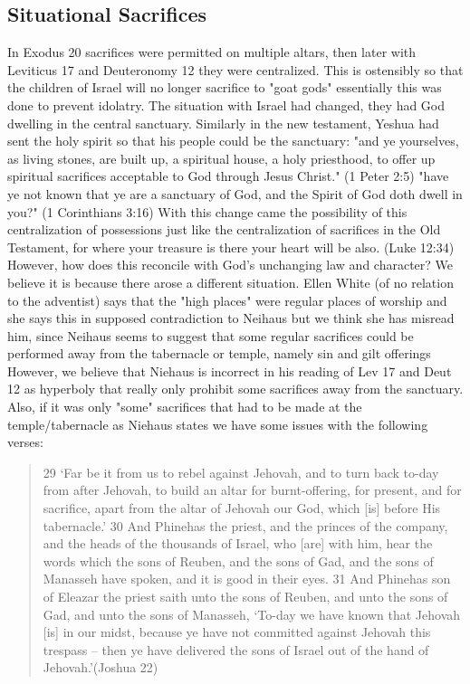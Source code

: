 \documentclass[11pt]{article}
\begin{document}
\subsection{Situational Sacrifices} \label{situational sacrifices}
In Exodus 20 sacrifices were permitted on multiple altars, then later with Leviticus 17 and Deuteronomy 12 they were centralized. This is ostensibly so that the children of Israel will no longer sacrifice to "goat gods" essentially this was done to prevent idolatry. The situation with Israel had changed, they had God dwelling in the central sanctuary. Similarly in the new testament, Yeshua had sent the holy spirit so that his people could be the sanctuary: 
"and ye yourselves, as living stones, are built up, a spiritual house, a holy priesthood, to offer up spiritual sacrifices acceptable to God through Jesus Christ." (1 Peter 2:5)
"have ye not known that ye are a sanctuary of God, and the Spirit of God doth dwell in you?" (1 Corinthians 3:16) With this change came the possibility of this centralization of possessions just like the centralization of sacrifices in the Old Testament, for where your treasure is there your heart will be also. (Luke 12:34) However, how does this reconcile with God's unchanging law and character? We believe it is because there arose a different situation. 
Ellen White (of no relation to the adventist) says that the "high places" were regular places of worship\cite{ellen white} and she says this in supposed contradiction to Neihaus but we think she has misread him, since Neihaus seems to suggest that some regular sacrifices could be performed away from the tabernacle or temple, namely sin and gilt offerings \cite{niehaus} However, we believe that Niehaus is incorrect in his reading of Lev 17 and Deut 12 as hyperboly that really only prohibit some sacrifices away from the sanctuary. Also, if it was only "some" sacrifices that had to be made at the temple/tabernacle as Niehaus states we have some issues with the following verses:
\begin{quote}
29 `Far be it from us to rebel against Jehovah, and to turn back to-day from after Jehovah, to build an altar for burnt-offering, for present, and for sacrifice, apart from the altar of Jehovah our God, which [is] before His tabernacle.'
30 And Phinehas the priest, and the princes of the company, and the heads of the thousands of Israel, who [are] with him, hear the words which the sons of Reuben, and the sons of Gad, and the sons of Manasseh have spoken, and it is good in their eyes.
31 And Phinehas son of Eleazar the priest saith unto the sons of Reuben, and unto the sons of Gad, and unto the sons of Manasseh, `To-day we have known that Jehovah [is] in our midst, because ye have not committed against Jehovah this trespass -- then ye have delivered the sons of Israel out of the hand of Jehovah.'(Joshua 22)
\end{quote}
\end{document}

